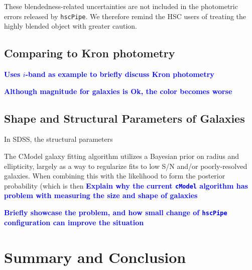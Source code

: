 \documentclass[useamsfonts]{pasj01}
\def\hscpipe{\texttt{hscPipe}}
\def\cmodel{\texttt{cModel}}
\newcommand{\plan}[1]{\textcolor{blue} {\textbf{#1}}}
\begin{document}
    These blendedness-related uncertainties are not included in the photometric errors
    released by \hscpipe{}.  
    We therefore remind the HSC users of treating the highly blended object with 
    greater caution.
    
\subsection{Comparing to Kron photometry}

    \plan{Uses $i$-band as example to briefly discuss Kron photometry}

    \plan{Although magnitude for galaxies is Ok, the color becomes worse}

\subsection{Shape and Structural Parameters of Galaxies}
    \label{ssec:shape}

    In SDSS, the structural parameters 
    
    The CModel galaxy fitting algorithm utilizes a Bayesian prior on radius and ellipticity, largely as a way to regularize fits to low S/N and/or poorly-resolved galaxies. When combining this with the likelihood to form the posterior probability (which is then
    \plan{Explain why the current \cmodel{}{} algorithm has problem with measuring
          the size and shape of galaxies}

    \plan{Briefly showcase the problem, and how small change of \hscpipe{}
          configuration can improve the situation}

\section{Summary and Conclusion}
    \label{sec:summary}
\end{document}
